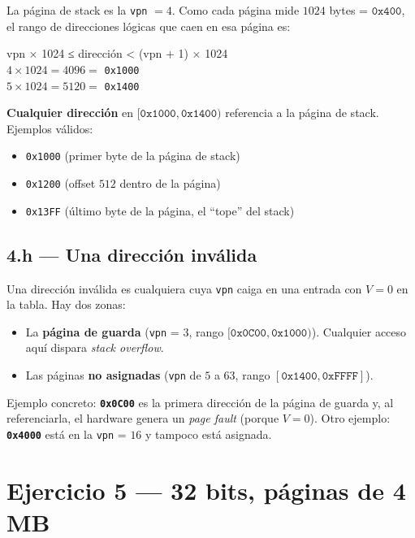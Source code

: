 \documentclass[11pt,a4paper]{article}
\begin{document}
La página de stack es la \texttt{vpn} $= 4$. Como cada página mide
$1024$ bytes = $\texttt{0x400}$, el rango de direcciones lógicas que
caen en esa página es:

\quad vpn × 1024 ≤ dirección < (vpn + 1) × 1024 \\
\quad $4 \times 1024 = 4096 =$ \texttt{0x1000} \\
\quad $5 \times 1024 = 5120 =$ \texttt{0x1400}

\textbf{Cualquier dirección} en $[\texttt{0x1000}, \texttt{0x1400})$
referencia a la página de stack. Ejemplos válidos:

\begin{itemize}[leftmargin=*,nosep]
    \item \texttt{0x1000} (primer byte de la página de stack)
    \item \texttt{0x1200} (offset $512$ dentro de la página)
    \item \texttt{0x13FF} (último byte de la página, el ``tope'' del
        stack)
\end{itemize}

\subsection{4.h --- Una dirección inválida}

Una dirección inválida es cualquiera cuya \texttt{vpn} caiga en una
entrada con $V=0$ en la tabla. Hay dos zonas:

\begin{itemize}[leftmargin=*]
    \item La \textbf{página de guarda} (\texttt{vpn} = $3$, rango
        $[\texttt{0x0C00}, \texttt{0x1000})$). Cualquier acceso aquí
        dispara \emph{stack overflow}.
    \item Las páginas \textbf{no asignadas} (\texttt{vpn} de $5$ a
        $63$, rango $[\texttt{0x1400}, \texttt{0xFFFF}]$).
\end{itemize}

Ejemplo concreto: \textbf{\texttt{0x0C00}} es la primera dirección de
la página de guarda y, al referenciarla, el hardware genera un
\emph{page fault} (porque $V=0$). Otro ejemplo: \textbf{\texttt{0x4000}}
está en la \texttt{vpn} = $16$ y tampoco está asignada.

\section{Ejercicio 5 --- 32 bits, páginas de 4 MB}
\end{document}
